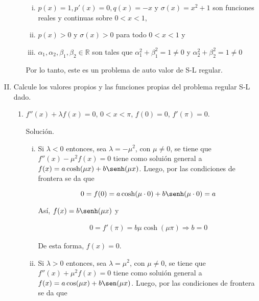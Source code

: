 \documentclass[fleqn]{article}
\newcommand{\real}{\mathbb{R}}
\begin{document}
\begin{enumerate}[I.]
\begin{enumerate}
			\begin{enumerate}[i)]
				\item $ p(x) = 1, p'(x) = 0, q(x) = -x $ y $ \sigma(x) = x^2 + 1 $ son funciones reales y continuas sobre $ 0 < x < 1 $,
				\item $ p(x) > 0 $ y $ \sigma(x) > 0 $ para todo $ 0 < x < 1 $ y
				\item $ \alpha_1, \alpha_2, \beta_1, \beta_2 \in \real $ son tales que $ \alpha_1^2 + \beta_1^2 = 1 \neq 0 $ y $ \alpha_2^2 + \beta_2^2 = 1 \neq 0 $
			\end{enumerate}

			Por lo tanto, este es un problema de auto valor de S-L regular.

		\end{enumerate}

		
		\bfseries
			
		\item Calcule los valores propios y las funciones propias del problema regular S-L dado.
		
		\begin{enumerate}
			\item $ f''(x) + \lambda f(x) = 0 $, $ 0 < x < \pi $, $ f(0) = 0 $, $ f'(\pi) = 0 $.
			
			Solución.
			
			\normalfont

			\begin{enumerate}[i)]
				\item Si $ \lambda < 0 $ entonces, sea $ \lambda = - \mu^2 $, con $ \mu \neq 0 $, se tiene que $ f''(x) - \mu^2 f(x) = 0 $
				tiene como soluión general a $ f(x) = a \cosh(\mu x) + b \senh(\mu x) $. Luego, por las condiciones de frontera se da que
				
				\begin{equation*}
					0 = f(0) = a \cosh(\mu \cdot 0) + b \senh(\mu \cdot 0) = a
				\end{equation*}

				Así, $ f(x) = b \senh(\mu x) $ y 

				\begin{align*}
					0 = f'(\pi) = b \mu \cosh(\mu \pi) \Longrightarrow b = 0
				\end{align*}
				
				De esta forma, $ f(x) = 0 $.

				\item Si $ \lambda > 0 $ entonces, sea $ \lambda = \mu^2 $, con $ \mu \neq 0 $, se tiene que $ f''(x) + \mu^2 f(x) = 0 $
				tiene como soluión general a $ f(x) = a \cos(\mu x) + b \sen(\mu x) $. Luego, por las condiciones de frontera se da que
				

\end{enumerate}
\end{enumerate}
\end{enumerate}
\end{document}
